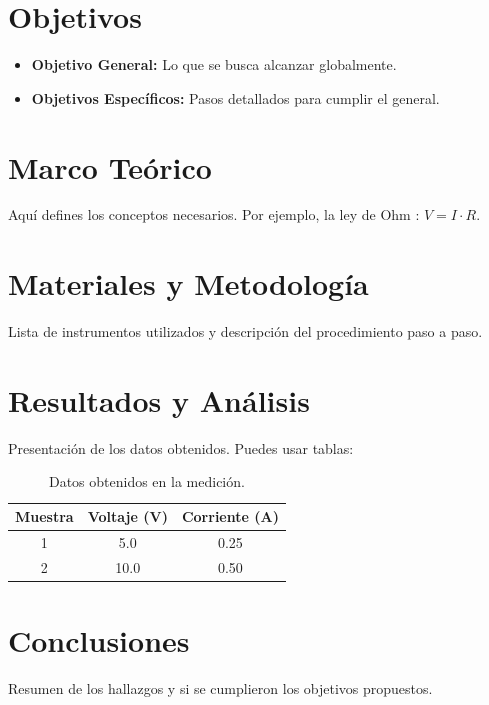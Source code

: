 \documentclass[12pt, letterpaper]{article}
\begin{document}
\section{Objetivos}
\begin{itemize}
    \item \textbf{Objetivo General:} Lo que se busca alcanzar globalmente.
    \item \textbf{Objetivos Específicos:} Pasos detallados para cumplir el general.
\end{itemize}

\section{Marco Teórico}
Aquí defines los conceptos necesarios. Por ejemplo, la ley de Ohm \cite{serway2018}:
$V = I \cdot R$. 

\section{Materiales y Metodología}
Lista de instrumentos utilizados y descripción del procedimiento paso a paso.

\section{Resultados y Análisis}
Presentación de los datos obtenidos. Puedes usar tablas:

\begin{table}[H]
    \centering
    \caption{Datos obtenidos en la medición.}
    \begin{tabular}{|c|c|c|}
    \hline
    \textbf{Muestra} & \textbf{Voltaje (V)} & \textbf{Corriente (A)} \\ \hline
    1 & 5.0 & 0.25 \\ \hline
    2 & 10.0 & 0.50 \\ \hline
    \end{tabular}
\end{table}

\section{Conclusiones}
Resumen de los hallazgos y si se cumplieron los objetivos propuestos.

\newpage
{} %
\end{document}
